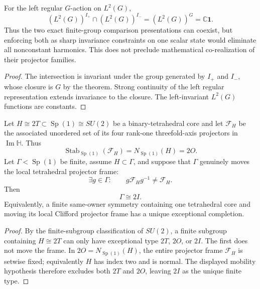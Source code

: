 \documentclass[11pt]{article}
\begin{document}
\begin{corollary}
\label{p1:cor:v273-twins-sharp-common-invariants}
For the left regular $G$-action on $L^2(G)$,
\[
 (L^2(G))^{I_+}\cap(L^2(G))^{I_-}
       =(L^2(G))^{G}=\mathbb C\boldsymbol1.
\]
Thus the two exact finite-group comparison presentations can coexist,
but enforcing both as sharp invariance constraints on one scalar state
would eliminate all nonconstant harmonics. This does not preclude
mathematical co-realization of their projector families.
\end{corollary}
\begin{proof}
The intersection is invariant under the group generated by $I_+$
and $I_-$, whose closure is $G$ by the theorem. Strong continuity of
the left regular representation extends invariance to the closure.
The left-invariant $L^2(G)$ functions are constants.
\end{proof}

\begin{theorem}
\label{p1:thm:v237-mobile-tetrahedral-completion}
Let \(H\cong2T\subset \operatorname{Sp}(1)\cong SU(2)\) be a binary-tetrahedral core and let
\(\mathcal F_H\) be the associated unordered set of its four rank-one
threefold-axis projectors in \(\operatorname{Im}\mathbb H\).  Thus
\[
 \operatorname{Stab}_{\operatorname{Sp}(1)}(\mathcal F_H)=N_{\operatorname{Sp}(1)}(H)=2O.
\]
Let \(\Gamma<\operatorname{Sp}(1)\) be finite, assume \(H\subset\Gamma\), and suppose that
\(\Gamma\) genuinely moves the local tetrahedral projector frame:
\[
 \exists g\in\Gamma:\qquad g\mathcal F_Hg^{-1}\ne\mathcal F_H.
\]
Then
\[
 \boxed{\Gamma\cong2I.}
\]
Equivalently, a finite same-owner symmetry containing one tetrahedral core and
moving its local Clifford projector frame has a unique exceptional completion.
\end{theorem}

\begin{proof}
By the finite-subgroup classification of \(SU(2)\), a finite subgroup
containing \(H\cong2T\) can only have exceptional type \(2T\), \(2O\), or
\(2I\).  The first does not move the frame.  In \(2O=N_{\operatorname{Sp}(1)}(H)\), the
entire projector frame \(\mathcal F_H\) is setwise fixed; equivalently \(H\)
has index two and is normal.  The displayed mobility hypothesis therefore
excludes both \(2T\) and \(2O\), leaving \(2I\) as the unique finite type.
\end{proof}
\end{document}
